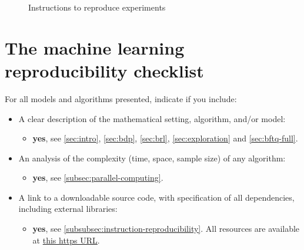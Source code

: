 \begin{figure}
    \centering
    


\caption{Instructions to reproduce experiments}
    \label{fig:instructions}
\end{figure}


\section{The machine learning reproducibility checklist}
\label{sec:ml-checklist}
For all models and algorithms presented, indicate if you include: 

\begin{itemize}
    \item  A clear description of the mathematical setting, algorithm, and/or model:
    
    \begin{itemize}\item \textbf{yes}, see \autoref{sec:intro}, \autoref{sec:bdp}, \autoref{sec:brl},
    \autoref{sec:exploration} and \autoref{sec:bftq-full}.
    \end{itemize}
    \item An analysis of the complexity (time, space, sample size) of any algorithm:
    \begin{itemize}\item \textbf{yes}, see \autoref{subsec:parallel-computing}.
    \end{itemize}
    \item A link to a downloadable source code, with specification of all dependencies, including external libraries:
    \begin{itemize}\item \textbf{yes}, see \autoref{subsubsec:instruction-reproducibility}. All resources are available at \href{https://budgeted-rl.github.io}{this https URL}.
    \end{itemize}
\end{itemize}


